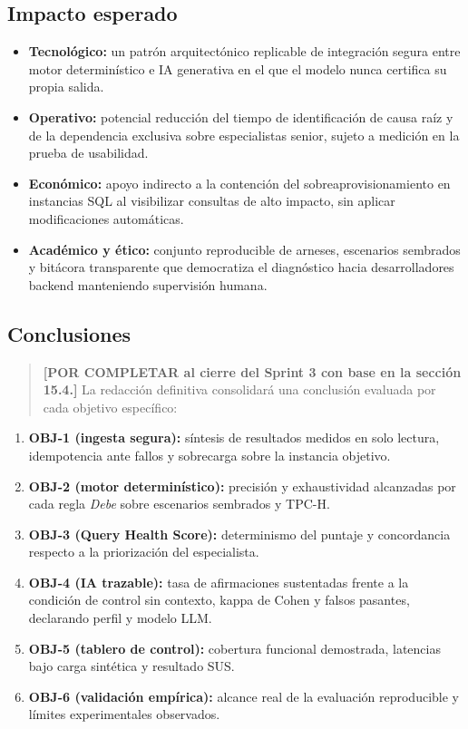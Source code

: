 \documentclass[12pt,a4paper]{article}
\begin{document}
\subsection{Impacto esperado}

\begin{itemize}[leftmargin=1.5em]
    \item \textbf{Tecnológico:} un patrón arquitectónico replicable de integración segura entre motor determinístico e IA generativa en el que el modelo nunca certifica su propia salida.
    \item \textbf{Operativo:} potencial reducción del tiempo de identificación de causa raíz y de la dependencia exclusiva sobre especialistas senior, sujeto a medición en la prueba de usabilidad.
    \item \textbf{Económico:} apoyo indirecto a la contención del sobreaprovisionamiento en instancias SQL al visibilizar consultas de alto impacto, sin aplicar modificaciones automáticas.
    \item \textbf{Académico y ético:} conjunto reproducible de arneses, escenarios sembrados y bitácora transparente que democratiza el diagnóstico hacia desarrolladores backend manteniendo supervisión humana.
\end{itemize}

\subsection{Conclusiones}

\begin{quote}
\textbf{[POR COMPLETAR al cierre del Sprint 3 con base en la sección 15.4.]} La redacción definitiva consolidará una conclusión evaluada por cada objetivo específico:
\end{quote}

\begin{enumerate}[leftmargin=1.5em]
    \item \textbf{OBJ-1 (ingesta segura):} síntesis de resultados medidos en solo lectura, idempotencia ante fallos y sobrecarga sobre la instancia objetivo.
    \item \textbf{OBJ-2 (motor determinístico):} precisión y exhaustividad alcanzadas por cada regla \textit{Debe} sobre escenarios sembrados y TPC-H.
    \item \textbf{OBJ-3 (Query Health Score):} determinismo del puntaje y concordancia respecto a la priorización del especialista.
    \item \textbf{OBJ-4 (IA trazable):} tasa de afirmaciones sustentadas frente a la condición de control sin contexto, kappa de Cohen y falsos pasantes, declarando perfil y modelo LLM.
    \item \textbf{OBJ-5 (tablero de control):} cobertura funcional demostrada, latencias bajo carga sintética y resultado SUS.
    \item \textbf{OBJ-6 (validación empírica):} alcance real de la evaluación reproducible y límites experimentales observados.
\end{enumerate}
\end{document}

